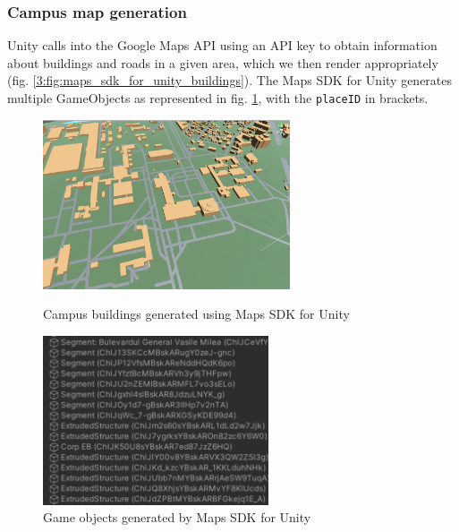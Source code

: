         \subsubsection{Campus map generation}
        
            Unity calls into the Google Maps API using an API key to obtain information about buildings and roads in a given area, which we then render appropriately (fig. \ref{3:fig:maps_sdk_for_unity_buildings}). The Maps SDK for Unity generates multiple GameObjects as represented in fig. \ref{3:fig:maps_sdk_for_unity_gameobjects}, with the \texttt{placeID} in brackets.
            
            \begin{figure}[!ht]
                \centering
                \begin{minipage}[b]{0.49\textwidth}
                    \captionsetup{justification=centering}
                    \includegraphics[height=5cm]{figures/demos/maps_sdk_for_unity_buildings.png}
                    \caption{Campus buildings generated using Maps SDK for Unity}
                    \label{3:fig:maps_sdk_for_unity_buildings}
                \end{minipage}
                \hfill
                \begin{minipage}[b]{0.49\textwidth}
                    \captionsetup{justification=centering}
                     \includegraphics[height=5cm]{figures/demos/maps_sdk_for_unity_gameobjects.png}
                    \caption{Game objects generated by Maps SDK for Unity}
                    \label{3:fig:maps_sdk_for_unity_gameobjects}
                \end{minipage}
            \end{figure}
            
